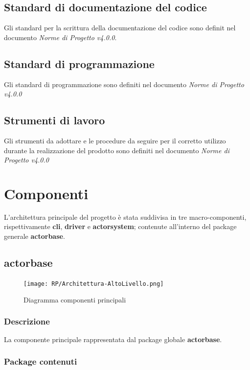 \documentclass{scalatekids-article}
\begin{document}
\subsection{Standard di documentazione del codice}
Gli standard per la scrittura della documentazione del codice sono definit nel
documento \textit{Norme di Progetto v4.0.0}.

\subsection{Standard di programmazione}
Gli standard di programmazione sono definiti nel documento \textit{Norme di Progetto v4.0.0}

\subsection{Strumenti di lavoro}
Gli strumenti da adottare e le procedure da seguire per il corretto utilizzo
durante la realizzazione del prodotto sono definiti nel documento \textit{Norme
  di Progetto v4.0.0}

\section{Componenti}

L'architettura principale del progetto è stata suddivisa in tre macro-componenti, rispettivamente
\textbf{cli}, \textbf{driver} e \textbf{actorsystem}; contenute all'interno del package
generale \textbf{actorbase}.

\subsection{actorbase}
\label{sec:actorbase}

\begin{figure}[H]
  \begin{center}
    \texttt{[image: RP/Architettura-AltoLivello.png]}
    \caption{Diagramma componenti principali}
  \end{center}
\end{figure}

\subsubsection{Descrizione}

La componente principale rappresentata dal package globale \textbf{actorbase}.

\subsubsection{Package contenuti}
\end{document}

